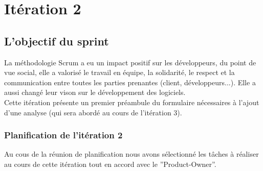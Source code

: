\section{Itération 2}

\subsection{L'objectif du sprint}
La méthodologie Scrum a eu un impact positif sur les développeurs, du point de vue social, elle
a valorisé le travail en équipe, la solidarité, le respect et la communication entre toutes les
parties prenantes (client, développeurs...). Elle a aussi changé leur vison sur le développement
des logiciels.\\
Cette itération présente un premier préambule du formulaire nécessaires à l’ajout
d’une analyse (qui sera abordé au cours de l’itération 3).
  \subsubsection{Planification de l'itération 2}
  Au cous de la réunion de planification nous avons sélectionné les tâches à réaliser au
  cours de cette itération tout en accord avec le ”Product-Owner”.
